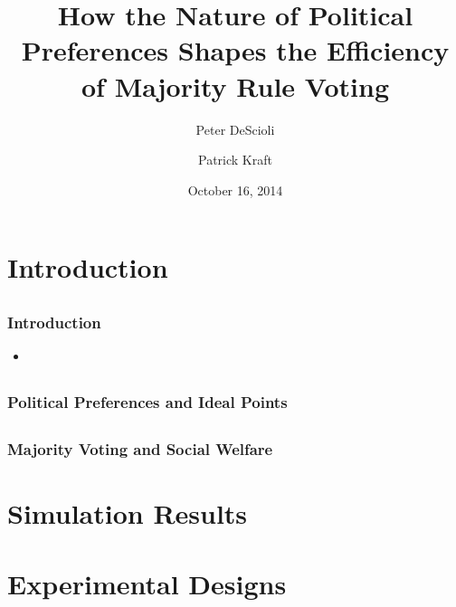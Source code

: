 \documentclass{beamer}
\author[DeScioli \& Kraft]{Peter DeScioli \and Patrick Kraft}
\institute[Stony Brook]{Center for Behavioral Political Economy}
\title[Voter Utilities and Majority Voting]{How the Nature of Political Preferences Shapes the Efficiency of Majority Rule Voting}
\date{October 16, 2014}
\begin{document}
\frame{\titlepage}

\section{Introduction}
\subsection{}
\begin{frame}%
\frametitle{Introduction}
\begin{itemize}
\item \cite{todorov2005inferences}
\end{itemize}
\end{frame}

\subsection{}
\begin{frame}%
  \frametitle{Political Preferences and Ideal Points}
  \citet{downs1957economic}
\end{frame}

\subsection{}
\begin{frame}%
  \frametitle{Majority Voting and Social Welfare}
  \citet{hastie2005robust}
\end{frame}

\section{Simulation Results}
\subsection{}
\begin{frame}%
  \frametitle{}

\end{frame}

\section{Experimental Designs}
\subsection{}
\begin{frame}%
  \frametitle{}
  \citet{oprea2007compensation}
\end{frame}
\end{document}
